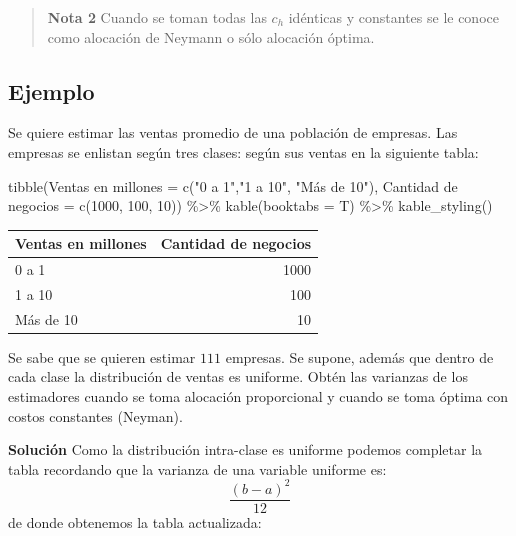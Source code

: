 \documentclass[
]{book}
\newenvironment{Shaded}{\begin{snugshade}}{\end{snugshade}}
\newcommand{\AttributeTok}[1]{\textcolor[rgb]{0.77,0.63,0.00}{#1}}
\newcommand{\DecValTok}[1]{\textcolor[rgb]{0.00,0.00,0.81}{#1}}
\newcommand{\FunctionTok}[1]{\textcolor[rgb]{0.00,0.00,0.00}{#1}}
\newcommand{\NormalTok}[1]{#1}
\newcommand{\OtherTok}[1]{\textcolor[rgb]{0.56,0.35,0.01}{#1}}
\newcommand{\SpecialCharTok}[1]{\textcolor[rgb]{0.00,0.00,0.00}{#1}}
\newcommand{\StringTok}[1]{\textcolor[rgb]{0.31,0.60,0.02}{#1}}
\begin{document}
\begin{quote}
\textbf{Nota 2} Cuando se toman todas las \(c_h\) idénticas y constantes se le conoce como alocación de Neymann o sólo alocación óptima.
\end{quote}

\hypertarget{ejemplo-3}{%
\subsection{Ejemplo}\label{ejemplo-3}}

Se quiere estimar las ventas promedio de una población de empresas. Las empresas se enlistan según tres clases: según sus ventas en la siguiente tabla:

\begin{Shaded}
\begin{Highlighting}[]
\FunctionTok{tibble}\NormalTok{(}\StringTok{\textasciigrave{}}\AttributeTok{Ventas en millones}\StringTok{\textasciigrave{}} \OtherTok{=} \FunctionTok{c}\NormalTok{(}\StringTok{"0 a 1"}\NormalTok{,}\StringTok{"1 a 10"}\NormalTok{, }\StringTok{"Más de 10"}\NormalTok{),}
       \StringTok{\textasciigrave{}}\AttributeTok{Cantidad de negocios}\StringTok{\textasciigrave{}} \OtherTok{=} \FunctionTok{c}\NormalTok{(}\DecValTok{1000}\NormalTok{, }\DecValTok{100}\NormalTok{, }\DecValTok{10}\NormalTok{)) }\SpecialCharTok{\%\textgreater{}\%}
  \FunctionTok{kable}\NormalTok{(}\AttributeTok{booktabs =}\NormalTok{ T) }\SpecialCharTok{\%\textgreater{}\%} \FunctionTok{kable\_styling}\NormalTok{()}
\end{Highlighting}
\end{Shaded}

\begin{table}
\centering
\begin{tabular}{lr}
\toprule
Ventas en millones & Cantidad de negocios\\
\midrule
0 a 1 & 1000\\
1 a 10 & 100\\
Más de 10 & 10\\
\bottomrule
\end{tabular}
\end{table}

Se sabe que se quieren estimar \(111\) empresas. Se supone, además que dentro de cada clase la distribución de ventas es uniforme. Obtén las varianzas de los estimadores cuando se toma alocación proporcional y cuando se toma óptima con costos constantes (Neyman).

\textbf{Solución} Como la distribución intra-clase es uniforme podemos completar la tabla recordando que la varianza de una variable uniforme es:
\[
\frac{(b-a)^2}{12}
\]
de donde obtenemos la tabla actualizada:
\end{document}
